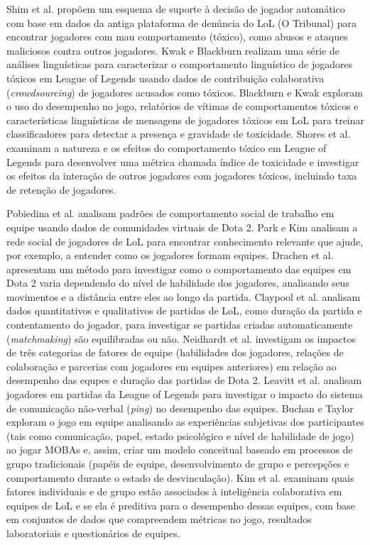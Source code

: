 Shim et al. \cite{shim2014decision} propõem um esquema de suporte à decisão de jogador automático com base em dados da antiga plataforma de denúncia do LoL (O Tribunal) para encontrar jogadores com mau comportamento (tóxico), como abusos e ataques maliciosos contra outros jogadores. Kwak e Blackburn \cite{kwak2014linguistic} realizam uma série de análises linguísticas para caracterizar o comportamento linguístico de jogadores tóxicos em League of Legends usando dados de contribuição colaborativa (\textit{crowdsourcing}) de jogadores acusados como tóxicos. Blackburn e Kwak \cite{blackburn2014stfu} exploram o uso do desempenho no jogo, relatórios de vítimas de comportamentos tóxicos e características linguísticas de mensagens de jogadores tóxicos em LoL para treinar classificadores para detectar a presença e gravidade de toxicidade. Shores et al. \cite{shores2014identification} examinam a natureza e os efeitos do comportamento tóxico em League of Legends para desenvolver uma métrica chamada índice de toxicidade e investigar os efeitos da interação de outros jogadores com jogadores tóxicos, incluindo taxa de retenção de jogadores.

Pobiedina et al. \cite{pobiedina2013ranking} analisam padrões de comportamento social de trabalho em equipe usando dados de comunidades virtuais de Dota 2. Park e Kim \cite{park2014social} analisam a rede social de jogadores de LoL para encontrar conhecimento relevante que ajude, por exemplo, a entender como os jogadores formam equipes. Drachen et al. \cite{drachen2014skill} apresentam um método para investigar como o comportamento das equipes em Dota 2 varia dependendo do nível de habilidade dos jogadores, analisando seus movimentos e a distância entre eles ao longo da partida. Claypool et al. \cite{claypool2015surrender} analisam dados quantitativos e qualitativos de partidas de LoL, como duração da partida e contentamento do jogador, para investigar se partidas criadas automaticamente (\textit{matchmaking}) são equilibradas ou não. Neidhardt et al. \cite{neidhardt2015team} investigam os impactos de três categorias de fatores de equipe (habilidades dos jogadores, relações de colaboração e parcerias com jogadores em equipes anteriores) em relação ao desempenho das equpes e duração das partidas de Dota 2. Leavitt et al. \cite{leavitt2016ping} analisam jogadores em partidas da League of Legends para investigar o impacto do sistema de comunicação não-verbal (\textit{ping}) no desempenho das equipes. Buchan e Taylor \cite{buchan2016qualitative} exploram o jogo em equipe analisando as experiências subjetivas dos participantes (tais como comunicação, papel, estado psicológico e nível de habilidade de jogo) ao jogar MOBAs e, assim, criar um modelo conceitual baseado em processos de grupo tradicionais (papéis de equipe, desenvolvimento de grupo e percepções e comportamento durante o estado de desvinculação). Kim et al. \cite{kim2017makes} examinam quais fatores individuais e de grupo estão associados à inteligência colaborativa em equipes de LoL e se ela é preditiva para o desempenho dessas equipes, com base em conjuntos de dados que compreendem métricas no jogo, resultados laboratoriais e questionários de equipes.


